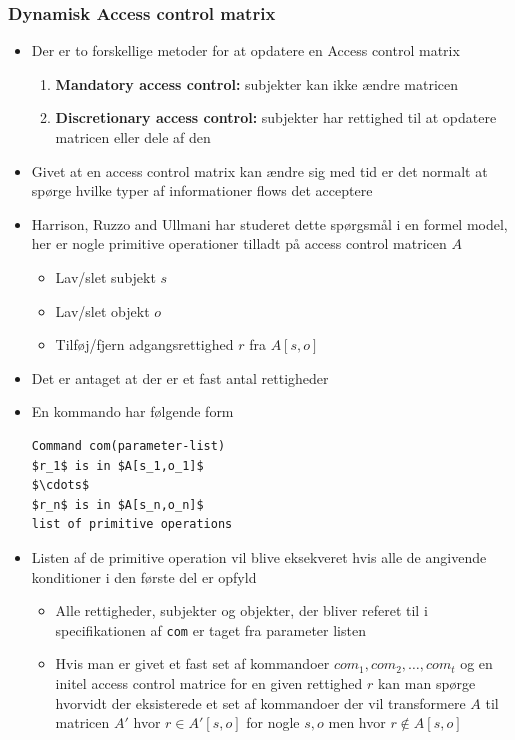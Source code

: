 \documentclass[a4, english]{article}
\begin{document}
\subsubsection{Dynamisk Access control matrix}
\begin{itemize}
	\item Der er to forskellige metoder for at opdatere en Access control matrix 
  \begin{enumerate}
  	\item \textbf{Mandatory access control:} subjekter kan ikke ændre matricen
    \item \textbf{Discretionary access control:} subjekter har rettighed til at opdatere matricen eller dele af den
  \end{enumerate}
  \item Givet at en access control matrix kan ændre sig med tid er det normalt at spørge hvilke typer af informationer flows det acceptere 
  \item Harrison, Ruzzo and Ullmani har studeret dette spørgsmål i en formel model, her er nogle primitive operationer tilladt på access control matricen $A$   
  \begin{itemize}
  	\item Lav/slet subjekt $s$
    \item Lav/slet objekt $o$ 
    \item Tilføj/fjern adgangsrettighed $r$ fra $A[s,o]$
  \end{itemize}
  \item Det er antaget at der er et fast antal rettigheder
  \item En kommando har følgende form
\begin{lstlisting}[mathescape=true]
Command com(parameter-list)
$r_1$ is in $A[s_1,o_1]$
$\cdots$
$r_n$ is in $A[s_n,o_n]$
list of primitive operations
\end{lstlisting}
  \item Listen af de primitive operation vil blive eksekveret hvis alle de angivende konditioner i den første del er opfyld
  \begin{itemize}
  	\item Alle rettigheder, subjekter og objekter, der bliver referet til i specifikationen af \texttt{com} er taget fra parameter listen
    \item Hvis man er givet et fast set af kommandoer $com_1, com_2, \dots, com_t$ og en initel access control matrice for en given rettighed $r$ kan man spørge hvorvidt der eksisterede et set af kommandoer der vil transformere $A$ til matricen $A'$ hvor $r \in A'[s,o]$ for nogle $s,o$ men hvor $r \notin A[s,o]$  

\end{itemize}
\end{itemize}
\end{document}
